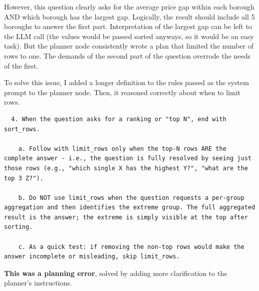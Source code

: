 However, this question clearly asks for the average price gap within each borough AND which borough has the largest gap. Logically, the result should include all 5 boroughs to answer the first part. Interpretation of the largest gap can be left to the LLM call (the values would be passed sorted anyways, so it would be an easy task). But the planner node consistently wrote a plan that limited the number of rows to one. The demands of the second part of the question overrode the needs of the first.

To solve this issue, I added a longer definition to the rules passed as the system prompt to the planner node. Then, it reasoned correctly about when to limit rows.

\begin{verbatim}
  4. When the question asks for a ranking or "top N", end with sort_rows.

    a. Follow with limit_rows only when the top-N rows ARE the complete answer - i.e., the question is fully resolved by seeing just those rows (e.g., "which single X has the highest Y?", "what are the top 3 Z?").

    b. Do NOT use limit_rows when the question requests a per-group aggregation and then identifies the extreme group. The full aggregated result is the answer; the extreme is simply visible at the top after sorting.

    c. As a quick test: if removing the non-top rows would make the answer incomplete or misleading, skip limit_rows.
\end{verbatim}

\textbf{This was a planning error}, solved by adding more clarification to the planner's instructions.
